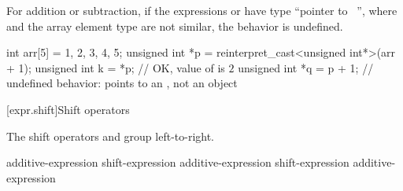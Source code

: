 \pnum
For addition or subtraction, if the expressions  or  have
type ``pointer to \cv{}~'', where  and the array element type
are not similar, the behavior is undefined.
%
%
%
%
%
\begin{example}
\begin{codeblock}
int arr[5] = {1, 2, 3, 4, 5};
unsigned int *p = reinterpret_cast<unsigned int*>(arr + 1);
unsigned int k = *p;            // OK, value of  is $2$
unsigned int *q = p + 1;        // undefined behavior:  points to an , not an  object
\end{codeblock}
\end{example}

[expr.shift]{Shift operators}

\pnum
{}%
%
%
%
%
%
The shift operators \tcode{<<} and \tcode{>>} group left-to-right.

%
%
%
%
%
\begin{bnf}
\br
    additive-expression\br
    shift-expression \terminal{<<} additive-expression\br
    shift-expression \terminal{>>} additive-expression
\end{bnf}

